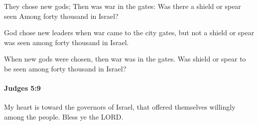 			\begin{versebox}
					\item[BHS] 
					\item[ASV] They chose new gods; Then was war in the gates: Was there a shield or spear seen Among forty thousand in Israel?
					\item[NIV] God chose new leaders when war came to the city gates, but not a shield or spear was seen among forty thousand in Israel.
					\item[NRSV] When new gods were chosen, then war was in the gates. Was shield or spear to be seen among forty thousand in Israel?
			\end{versebox}

		\paragraph{Judges 5:9} %
			\label{JUDGES-5-9}

			My heart is toward the governors of Israel, that offered themselves willingly among the people. Bless ye the LORD.

